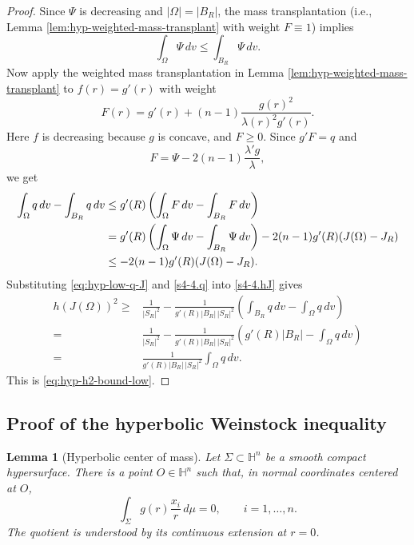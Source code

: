 \documentclass[11pt,reqno]{amsart}
\numberwithin{equation}{section}
\newtheorem{lemma}[theorem]{Lemma}
\theoremstyle{definition}
\newcommand{\HH}{\mathbb H}
\begin{document}
\begin{proof}
Since $\Psi$ is decreasing and $|\Omega|=|B_R|$, the mass transplantation (i.e., Lemma \ref{lem:hyp-weighted-mass-transplant} with weight $F\equiv1$) implies 
\begin{equation*}
    \int_\Omega \Psi\,dv\leq \int_{B_R}\Psi\,dv.
\end{equation*}
Now apply the weighted mass transplantation in Lemma \ref{lem:hyp-weighted-mass-transplant} to $f(r)=g'(r)$ with weight
\begin{equation*}
    F(r)=g'(r)+(n-1)\frac{g(r)^2}{\lambda(r)^2g'(r)}.
\end{equation*}
Here $f$ is decreasing because $g$ is concave, and $F\geq0$.  Since $g'F=q$ and
\begin{equation*}
    F=\Psi-2(n-1)\frac{\lambda'g}{\lambda},
\end{equation*}
we get
\begin{align}
    \int_\Omega q\,dv-\int_{B_R}q\,dv
    &\leq g'(R)\left(\int_\Omega F\,dv-\int_{B_R}F\,dv\right) \notag\\
    &=g'(R)\left(\int_\Omega \Psi\,dv-\int_{B_R}\Psi\,dv\right)
       -2(n-1)g'(R)(J(\Omega)-J_R) \notag\\
    &\leq -2(n-1)g'(R)(J(\Omega)-J_R).\label{eq:hyp-low-q-J}
\end{align}
Substituting \eqref{eq:hyp-low-q-J} and \eqref{s4-4.q} into \eqref{s4-4.hJ} gives
\begin{align*}
    h(J(\Omega))^2
    \geq &\frac1{|S_R|^2}
       -\frac{1}{g'(R)|B_R|\,|S_R|^2}
        \left(\int_{B_R}q\,dv-\int_\Omega q\,dv\right) \\
    =&\frac1{|S_R|^2}
       -\frac{1}{g'(R)|B_R|\,|S_R|^2}
        \left(g'(R)|B_R|-\int_\Omega q\,dv\right) \\
    =&\frac{1}{g'(R)|B_R|\,|S_R|^2}\int_\Omega q\,dv.
\end{align*}
This is \eqref{eq:hyp-h2-bound-low}.
\end{proof}

\subsection{Proof of the hyperbolic Weinstock inequality}

\begin{lemma}[Hyperbolic center of mass]\label{lem:hyp-center-of-mass}
Let $\Sigma\subset\HH^n$ be a smooth compact hypersurface.  There is a point $O\in\HH^n$ such that, in normal coordinates centered at $O$,
\begin{equation}\label{eq:hyp-center-mass}
    \int_\Sigma g(r)\frac{x_i}{r}\,d\mu=0,
    \qquad i=1,\ldots,n.
\end{equation}
The quotient is understood by its continuous extension at $r=0$.
\end{lemma}
\end{document}
